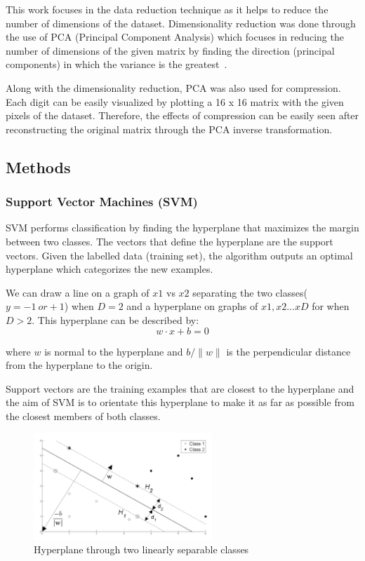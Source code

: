 \documentclass[letterpaper,10pt]{article}
\theoremstyle{mytheor}
\begin{document}
This work focuses in the data reduction technique as it helps to reduce the number of dimensions of the dataset. Dimensionality reduction was done through the use of PCA (Principal Component Analysis) which focuses in reducing the number of dimensions of the given matrix by finding the direction (principal components) in which the variance is the greatest~\cite{bishop2007pattern}.

Along with the dimensionality reduction, PCA was also used for compression. Each digit can be easily visualized by plotting a 16 x 16 matrix with the given pixels of the dataset. Therefore, the effects of compression can be easily seen after reconstructing the original matrix through the PCA inverse transformation. 
 
\subsection{Methods}

\subsubsection{Support Vector Machines (SVM)}

SVM performs classification by finding the hyperplane that maximizes the margin between two classes. The vectors that define the hyperplane are the support vectors. Given the labelled data (training set), the algorithm outputs an optimal hyperplane which categorizes the new examples.

We can draw a line on a graph of $x1$ vs $x2$ separating the two classes($y = -1\  or +1$) when $D = 2$ and a hyperplane on graphs of $x1, x2 ...xD$ for when $D > 2$.  This hyperplane can be described by:
\begin{equation}
w \cdot x + b = 0
\end{equation}

where $w$ is normal to the hyperplane and $b/\|w\|$ is the perpendicular distance from the hyperplane to the origin.

Support vectors are the training examples that are closest to the hyperplane and the aim of SVM is to orientate this hyperplane to make it as far as possible from the closest members of both classes.

\begin{figure}[H]
\includegraphics[width=0.6\textwidth]{svm}
\centering
\caption{Hyperplane through two linearly separable classes}
\label{fig:2}
\end{figure}
\end{document}

